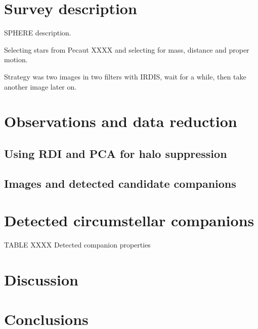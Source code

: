 \documentclass[onecolumn]{aa} %
\begin{document}
\section{Survey description}\label{sec:sample}

SPHERE description.

Selecting stars from Pecaut XXXX and selecting for mass, distance and proper motion.

Strategy was two images in two filters with IRDIS, wait for a while, then take another image later on.

\lipsum[2-8]

\section{Observations and data reduction}\label{sec:obs}
\lipsum[2-8]

\subsection{Using RDI and PCA for halo suppression}
\lipsum[2-8]

\subsection{Images and detected candidate companions}
\lipsum[2-8]

\section{Detected circumstellar companions}\label{sec:companions}
\lipsum[2-8]

TABLE XXXX Detected companion properties

\lipsum[2-8]

\section{Discussion}\label{sec:discuss}
\lipsum[2-8]

\section{Conclusions}\label{sec:conc}
\lipsum[2-8]

\end{document}
